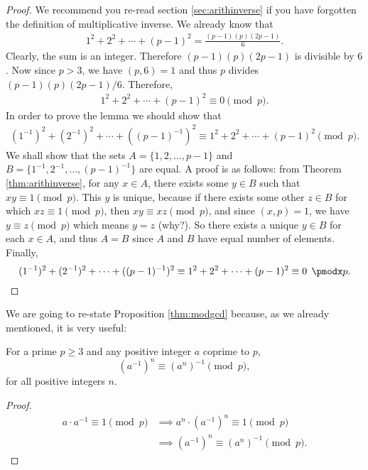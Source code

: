 \documentclass[12pt]{subfile}
\begin{document}
		\begin{proof}
			We recommend you re-read section \eqref{sec:arithinverse} if you have forgotten the definition of multiplicative inverse. We already know that
				\begin{align*}
					1^2+2^2+\cdots+(p-1)^2 = \frac{(p-1)(p)(2p-1)}{6}.
				\end{align*}
			Clearly, the sum is an integer. Therefore $(p-1)(p)(2p-1)$ is divisible by $6$. Now since $p>3$, we have $(p,6)=1$ and thus $p$ divides $(p-1)(p)(2p-1)/6$. Therefore,
				\begin{align*}
					1^2+2^2+\cdots+(p-1)^2 \equiv 0 \pmod p.
				\end{align*}
			In order to prove the lemma we should show that
				\begin{align*}
					(1^{-1})^2+(2^{-1})^2+\cdots+((p-1)^{-1})^2 \equiv 1^2+2^2+\cdots+(p-1)^2 \pmod p.
				\end{align*}
			We shall show that the sets $A=\{1,2,\ldots,p-1\}$ and $B=\{1^{-1}, 2^{-1},\ldots,(p-1)^{-1}\}$ are equal. A proof is as follows: from Theorem \ref{thm:arithinverse}, for any $x \in A$, there exists some $y \in B$ such that $xy \equiv 1 \pmod p$. This $y$ is unique, because if there exists some other $z \in B$ for which $xz \equiv 1 \pmod p$, then $xy \equiv xz \pmod p$, and since $(x,p)=1$, we have $y \equiv z \pmod p$ which means $y=z$ (why?). So there exists a unique $y\in B$ for each $x \in A$, and thus $A=B$ since $A$ and $B$ have equal number of elements. Finally,
				\begin{equation*}
					(1^{-1})^2+(2^{-1})^2+\cdots+((p-1)^{-1})^2 \equiv 1^2+2^2+\cdots+(p-1)^2 \equiv 0 \pmod p. \qedhere
				\end{equation*}
		\end{proof}
	We are going to re-state Proposition \ref{thm:modgcd} because, as we already mentioned, it is very useful:
		\begin{lemma}\label{lem:wolstproof3}
			For a prime $p\geq 3$ and any positive integer $a$ coprime to $p$,
			\[ (a^{-1})^n \equiv (a^n)^{-1} \pmod p,\]
			for all positive integers $n$.
		\end{lemma}
		
		\begin{proof}
			\begin{align*}
				a \cdot a^{-1} \equiv 1 \pmod p &\implies a^n \cdot (a^{-1})^n \equiv 1 \pmod p\\
				&\implies (a^{-1})^n \equiv (a^n)^{-1} \pmod p.
			\end{align*}
			
		\end{proof}
	
\end{document}

